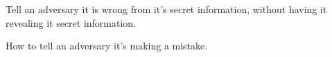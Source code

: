 
Tell an adversary it is wrong from it's secret information, without having it revealing it secret information. 

How to tell an adversary it's making a mistake. 
